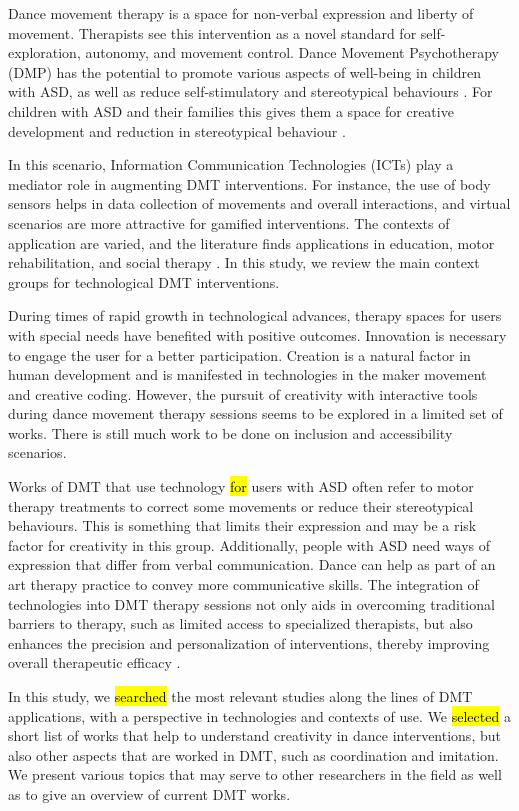 \documentclass[a4paper,fleqn]{cas-sc}
\begin{document}
Dance movement therapy is a space for non-verbal expression and liberty of movement. Therapists see this intervention as a novel standard for self-exploration, autonomy, and movement control.  Dance Movement Psychotherapy (DMP) has the potential to promote various aspects of well-being in children with ASD, as well as reduce self-stimulatory and stereotypical behaviours  \cite{Aithal2021} . For children with ASD and their families this gives them a space for creative development and reduction in stereotypical behaviour \cite{Ziadat22}.

In this scenario, Information Communication Technologies (ICTs) play a mediator role in augmenting DMT interventions. For instance, the use of body sensors helps in data collection of movements and overall interactions, and virtual scenarios are more attractive for gamified interventions. The contexts of application are varied, and the literature finds applications in education, motor rehabilitation, and social therapy \cite{Srinivasan2013}.  In this study, we review the main context groups for technological DMT interventions.

During times of rapid growth in technological advances, therapy spaces for users with special needs have benefited with positive outcomes. Innovation is necessary to engage the user for a better participation. Creation is a natural factor in human development and is manifested in technologies in the maker movement and creative coding. However, the pursuit of creativity with interactive tools during dance movement therapy sessions seems to be explored in a limited set of works. There is still much work to be done on inclusion and accessibility scenarios.

Works of DMT that use technology \hl{for} users with ASD often refer to motor therapy treatments to correct some movements or reduce their stereotypical behaviours. This is something that limits their expression and may be a risk factor for creativity in this group. Additionally, people with ASD need ways of expression that differ from verbal communication. Dance can help as part of an art therapy practice to convey more communicative skills. The integration of technologies into DMT therapy sessions not only aids in overcoming traditional barriers to therapy, such as limited access to specialized therapists, but also enhances the precision and personalization of interventions, thereby improving overall therapeutic efficacy \cite{Kientz2013}.


In  this study, we \hl{searched} the most relevant studies along the lines of DMT applications, with a perspective in technologies and contexts of use. We \hl{selected} a short list of works that help to understand creativity in dance interventions, but also other aspects that are worked in DMT, such as coordination and imitation. We present various topics that may serve to other researchers in the field as well as to give an overview of current DMT works.
\end{document}
